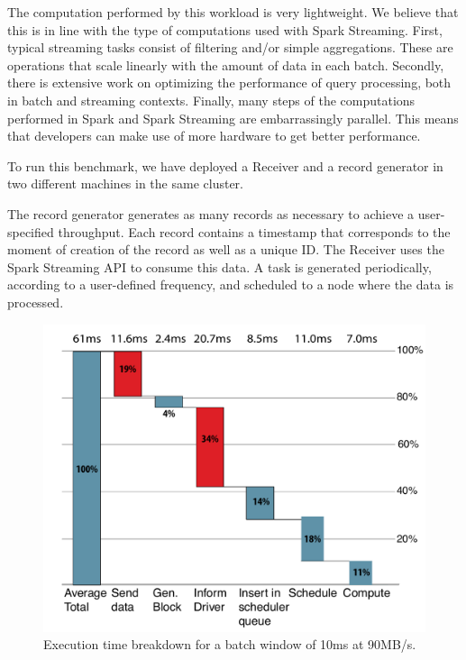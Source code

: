 The computation performed by this workload is very lightweight.
We believe that this is in line with the type of computations used with Spark Streaming.
First, typical streaming tasks consist of filtering and/or simple aggregations.
These are operations that scale linearly with the amount of data in each batch.
Secondly, there is extensive work on optimizing the performance of query processing, both in batch and streaming contexts.
Finally, many steps of the computations performed in Spark and Spark Streaming are embarrassingly parallel. 
This means that developers can make use of more hardware to get better performance. 


To run this benchmark, we have deployed a Receiver and a record generator in two different machines in the same cluster.

The record generator generates as many records as necessary to achieve a user-specified throughput.
Each record contains a timestamp that corresponds to the moment of creation of the record as well as a unique ID.
The Receiver uses the Spark Streaming API to consume this data. 
A task is generated periodically, according to a user-defined frequency, and scheduled to a node where the data is processed.

\begin{figure}[t!]
  \begin{center}
    \includegraphics[scale=0.40]{images_graphs/waterfall/Rplots_illustrator.pdf}
  \end{center}
  \caption{Execution time breakdown for a batch window of 10ms at 90MB/s.}
  \label{fig:SparkStreaming_time_breakdown}
\end{figure}

